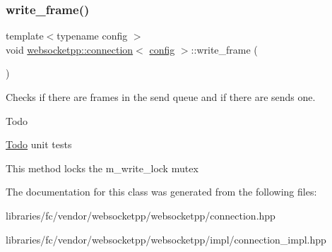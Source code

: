 \subsubsection{\texorpdfstring{write\+\_\+frame()}{write\_frame()}}
{\footnotesize\ttfamily template$<$typename config $>$ \\
void \mbox{\hyperlink{classwebsocketpp_1_1connection}{websocketpp\+::connection}}$<$ \mbox{\hyperlink{classconfig}{config}} $>$\+::write\+\_\+frame (\begin{DoxyParamCaption}{ }\end{DoxyParamCaption})}



Checks if there are frames in the send queue and if there are sends one. 

\begin{DoxyRefDesc}{Todo}
\item[\mbox{\hyperlink{todo__todo000006}{Todo}}]unit tests\end{DoxyRefDesc}


This method locks the m\+\_\+write\+\_\+lock mutex 

The documentation for this class was generated from the following files\+:\begin{DoxyCompactItemize}
\item 
libraries/fc/vendor/websocketpp/websocketpp/connection.\+hpp\item 
libraries/fc/vendor/websocketpp/websocketpp/impl/connection\+\_\+impl.\+hpp\end{DoxyCompactItemize}
